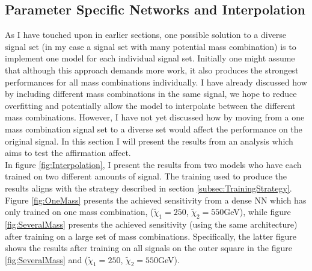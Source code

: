 \subsection{Parameter Specific Networks and Interpolation}
As I have touched upon in earlier sections, one possible solution to a diverse signal set (in my case a signal set with many 
potential mass combination) is to implement one model for each individual signal set. Initially one might assume that although 
this approach demands more work, it also produces the strongest performances for all mass combinations individually. I have already 
discussed how by including different mass combinations in the same signal, we hope to reduce overfitting and potentially allow 
the model to interpolate between the different mass combinations. However, I have not yet discussed how by moving from a one 
mass combination signal set to a diverse set would affect the performance on the original signal. In this section I will present the 
results from an analysis which aims to test the affirmation affect.
\\
In figure \ref{fig:Interpolation}, I present the results from two models who have each trained on two different amounts of signal.
The training used to produce the results aligns with the strategy described in section \ref{subsec:TrainingStrategy}.
Figure \ref{fig:OneMass} presents the achieved sensitivity from a dense \ac{NN} which has only trained on one mass combination,
($\tilde{\chi}_1=250$, $\tilde{\chi}_2=550$GeV), while figure \ref{fig:SeveralMass} presents the achieved sensitivity (using the same 
architecture) after training on a large set of mass combinations. Specifically, the latter figure shows the results after training on 
all signals on the outer square in the figure \ref{fig:SeveralMass} and ($\tilde{\chi}_1=250$, $\tilde{\chi}_2=550$GeV).\\
